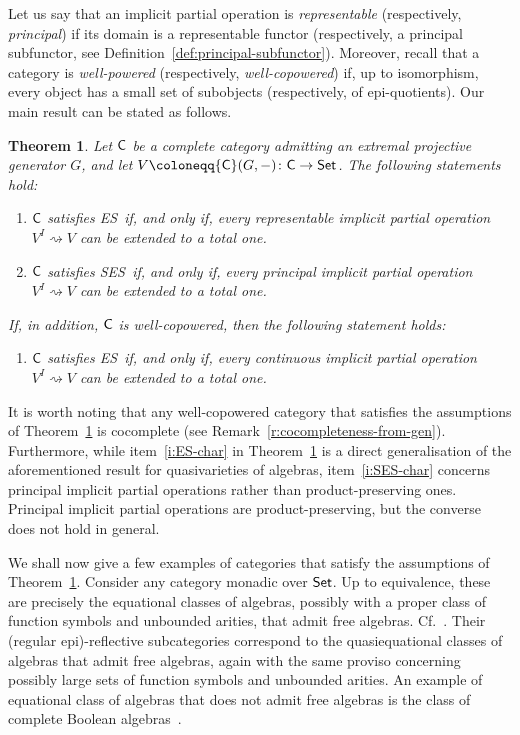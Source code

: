 \documentclass[a4paper,10pt,reqno]{amsart}
\newtheorem{theorem}{Theorem}[section]
\theoremstyle{definition}
\theoremstyle{remark}
\newcommand{\cat}{{\sf C}}								%
\newcommand{\Set}{{\sf Set}}							%
\newcommand{\ES}{\textnormal{ES}}
\newcommand{\SES}{\textnormal{SES}}
\begin{document}
Let us say that an implicit partial operation is \emph{representable} (respectively, \emph{principal}) if its domain is a representable functor (respectively, a principal subfunctor, see Definition~\ref{def:principal-subfunctor}). Moreover, recall that a category is \emph{well-powered} (respectively, \emph{well-copowered}) if, up to isomorphism, every object has a small set of subobjects (respectively, of epi-quotients).
%
Our main result can be stated as follows.


\begin{theorem}\label{t:main}
Let $\cat$ be a complete category admitting an extremal projective generator $G$, and let $V\coloneqq \cat(G,-)\colon \cat\to\Set$. The following statements hold:
\begin{enumerate}[label=(\roman*)]
\item\label{i:ES-char-representable} $\cat$ satisfies \ES~if, and only if, every representable implicit partial operation $V^{I} \rightsquigarrow V$ can be extended to a total one.
\item\label{i:SES-char} $\cat$ satisfies \SES~if, and only if, every principal implicit partial operation $V^{I} \rightsquigarrow V$ can be extended to a total one.
\end{enumerate}
If, in addition, $\cat$ is well-copowered, then the following statement holds:
\begin{enumerate}[label=(\roman*),resume]
\item\label{i:ES-char} $\cat$ satisfies \ES~if, and only if, every continuous implicit partial operation $V^{I} \rightsquigarrow V$ can be extended to a total one.
\end{enumerate}
\end{theorem}

It is worth noting that any well-copowered category that satisfies the assumptions of Theorem~\ref{t:main} is cocomplete (see Remark~\ref{r:cocompleteness-from-gen}).
%
Furthermore, while item~\ref{i:ES-char} in Theorem~\ref{t:main} is a direct generalisation of the aforementioned result for quasivarieties of algebras, item~\ref{i:SES-char} concerns principal implicit partial operations rather than product-preserving ones. Principal implicit partial operations are product-preserving, but the converse does not hold in general.

\medskip
We shall now give a few examples of categories that satisfy the assumptions of Theorem~\ref{t:main}. 
%
Consider any category monadic over $\Set$. Up to equivalence, these are precisely the equational classes of algebras, possibly with a proper class of function symbols and unbounded arities, that admit free algebras. Cf.\ \cite[Proposition~I.3.8]{Johnstone1982}. 
%
Their (regular epi)-reflective subcategories correspond to the quasiequational classes of algebras that admit free algebras, again with the same proviso concerning possibly large sets of function symbols and unbounded arities. An example of equational class of algebras that does not admit free algebras is the class of complete Boolean algebras~\cite{Gaifman1964,Hales1964}.
\end{document}
